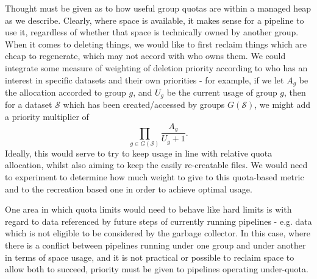\documentclass[10pt,a4paper]{article}
\newcommand{\npar}{\par\noindent\space}
\begin{document}
\npar Thought must be given as to how useful group quotas are within a managed heap as we describe. Clearly, where space is available, it makes sense for a pipeline to use it, regardless of whether that space is technically owned by another group. When it comes to deleting things, we would like to first reclaim things which are cheap to regenerate, which may not accord with who owns them. We could integrate some measure of weighting of deletion priority according to who has an interest in specific datasets and their own priorities - for example, if we let $ A_g $ be the allocation accorded to group $ g $, and $ U_g $ be the current usage of group $ g $, then for a dataset $ \mathcal{S} $ which has been created/accessed by groups $ G(\mathcal{S}) $, we might add a priority multiplier of \[ \prod_{g \in G(\mathcal{S})} \frac{A_g}{U_g + 1}. \]
Ideally, this would serve to try to keep usage in line with relative quota allocation, whilst also aiming to keep the easily re-creatable files. We would need to experiment to determine how much weight to give to this quota-based metric and to the recreation based one in order to achieve optimal usage.
\npar One area in which quota limits would need to behave like hard limits is with regard to data referenced by future steps of currently running pipelines - e.g. data which is not eligible to be considered by the garbage collector. In this case, where there is a conflict between pipelines running under one group and under another in terms of space usage, and it is not practical or possible to reclaim space to allow both to succeed, priority must be given to pipelines operating under-quota.
\end{document}
